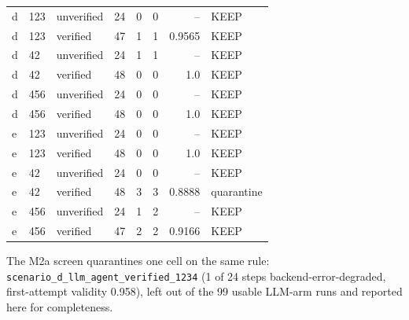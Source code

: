 \documentclass[11pt,a4paper]{article}
\begin{document}
\begin{table}[htbp]
\begin{tabular}{lllrrrrl}
d & 123 & unverified & 24 & 0 & 0 & -- & KEEP \\
d & 123 & verified & 47 & 1 & 1 & 0.9565 & KEEP \\
d & 42 & unverified & 24 & 1 & 1 & -- & KEEP \\
d & 42 & verified & 48 & 0 & 0 & 1.0 & KEEP \\
d & 456 & unverified & 24 & 0 & 0 & -- & KEEP \\
d & 456 & verified & 48 & 0 & 0 & 1.0 & KEEP \\
e & 123 & unverified & 24 & 0 & 0 & -- & KEEP \\
e & 123 & verified & 48 & 0 & 0 & 1.0 & KEEP \\
e & 42 & unverified & 24 & 0 & 0 & -- & KEEP \\
e & 42 & verified & 48 & 3 & 3 & 0.8888 & quarantine \\
e & 456 & unverified & 24 & 1 & 2 & -- & KEEP \\
e & 456 & verified & 47 & 2 & 2 & 0.9166 & KEEP \\
\bottomrule
\end{tabular}
\end{table}

The M2a screen quarantines one cell on the same rule:
\texttt{scenario\_d\_llm\_agent\_verified\_1234} (1 of 24 steps
backend-error-degraded, first-attempt validity 0.958), left out of the 99
usable LLM-arm runs and reported here for completeness.


\let\origthebibliography\thebibliography
\let\endorigthebibliography\endthebibliography
\renewenvironment{thebibliography}[1]{%
  \begin{small}\begin{origthebibliography}{#1}%
}{%
  \end{origthebibliography}\end{small}%
}

\end{document}
